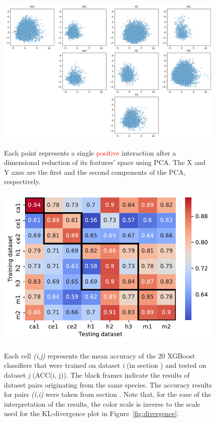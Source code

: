 \documentclass{bmcart}
\begin{document}
\begin{backmatter}
\begin{figure}[h!]
  \caption{} 
       \includegraphics[width=\textwidth]{5_unite_features_pca_resample_scale=True_all.png}
      \label{fig:feature_pca}
      \caption*{Each point represents a single \textcolor{red}{positive} interaction after a dimensional reduction of its features' space using PCA. The X and Y axes are the first and the second components of the PCA, respectively.}
      \end{figure}

\begin{figure}[h!]
  \caption{}
      \includegraphics[width=\textwidth]{6_diff_summary.pdf}
    \label{fig:crossdataset}
    \caption*{Each cell \textit{(i,j)} represents the mean accuracy of the 20 XGBoost classifiers that were trained on dataset \textit{i} (in section ) and tested on dataset \textit{j} (ACC(i, j)). The black frames indicate the results of dataset pairs originating from the same species. The accuracy results for pairs \textit{(i,i)} were taken from section . Note that, for the ease of the interpretation of the results, the color scale is inverse to the scale used for the KL-divergence plot in Figure~\ref{fig:divergence}.}
      \end{figure}



\end{backmatter}
\end{document}
